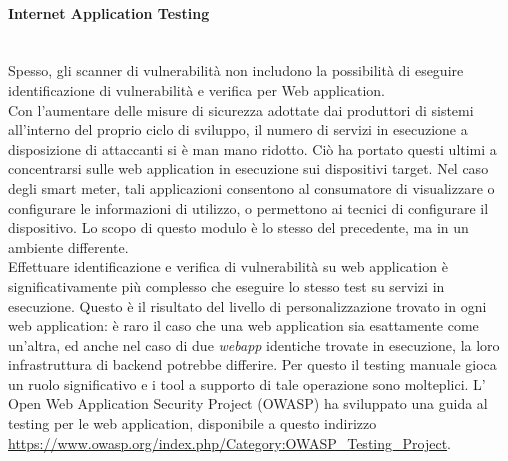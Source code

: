 \paragraph{Internet Application Testing}\mbox{}\\
Spesso, gli scanner di vulnerabilità non includono la possibilità di eseguire identificazione di vulnerabilità e verifica per Web application.\\
Con l'aumentare delle misure di sicurezza adottate dai produttori di sistemi all'interno del proprio ciclo di sviluppo, il numero di servizi in esecuzione a disposizione di attaccanti si è man mano ridotto. Ciò ha portato questi ultimi a concentrarsi sulle web application in esecuzione sui dispositivi target. Nel caso degli smart meter, tali applicazioni consentono al consumatore di visualizzare o configurare le informazioni di utilizzo, o permettono ai tecnici di configurare il dispositivo. Lo scopo di questo modulo è lo stesso del precedente, ma in un ambiente differente.\\
Effettuare identificazione e verifica di vulnerabilità su web application è significativamente più complesso che eseguire lo stesso test su servizi in esecuzione. Questo è il risultato del livello di personalizzazione trovato in ogni web application: è raro il caso che una web application sia esattamente come un'altra, ed anche nel caso di due \emph{webapp} identiche trovate in esecuzione, la loro infrastruttura di backend potrebbe differire. Per questo il testing manuale gioca un ruolo significativo e i tool a supporto di tale operazione sono molteplici. L' Open Web Application Security Project (OWASP) ha sviluppato una guida al testing per le web application, disponibile a questo indirizzo \url{https://www.owasp.org/index.php/Category:OWASP_Testing_Project}.

